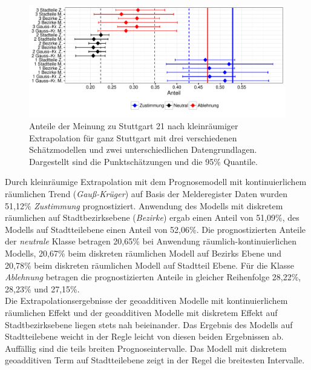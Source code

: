 \documentclass{Vorlage}
\begin{document}
\begin{figure}[h]
 \begin{center}
 \includegraphics[scale=0.8]{Pictures/S21AlleModelle}
 \caption{Anteile der Meinung zu Stuttgart 21 nach kleinräumiger Extrapolation für ganz Stuttgart mit drei verschiedenen Schätzmodellen und zwei unterschiedlichen Datengrundlagen. Dargestellt sind die Punktschätzungen und die 95\% Quantile.}
 \label{S21Alle}
 \end{center}
\end{figure}

Durch kleinräumige Extrapolation mit dem Prognosemodell mit kontinuierlichem räumlichen Trend (\textit{Gauß-Krüger}) auf Basis der Melderegister Daten wurden 51,12\% \textit{Zustimmung} prognostiziert. Anwendung des Modells mit diskretem räumlichen auf Stadtbezirksebene (\textit{Bezirke}) ergab einen Anteil von 51,09\%, des Modells auf Stadtteilebene einen Anteil von 52,06\%. Die prognostizierten Anteile der \textit{neutrale} Klasse betragen 20,65\% bei Anwendung räumlich-kontinuierlichen Modells, 20,67\% beim diskreten räumlichen Modell auf Bezirks Ebene und 20,78\% beim diskreten räumlichen Modell auf Stadtteil Ebene. Für die Klasse \textit{Ablehnung} betragen die prognostizierten Anteile in gleicher Reihenfolge 28,22\%, 28,23\% und 27,15\%.\\
Die Extrapolationsergebnisse der geoadditiven Modelle mit kontinuierlichem räumlichen Effekt und der geoadditiven Modelle mit diskretem Effekt auf Stadtbezirksebene liegen stets nah beieinander. Das Ergebnis des Modells auf Stadtteilebene weicht in der Regle leicht von diesen beiden Ergebnissen ab. Auffällig sind die teils breiten Prognoseintervalle. Das Modell mit diskretem geoadditiven Term auf Stadtteilebene zeigt in der Regel die breitesten Intervalle.
\end{document}

